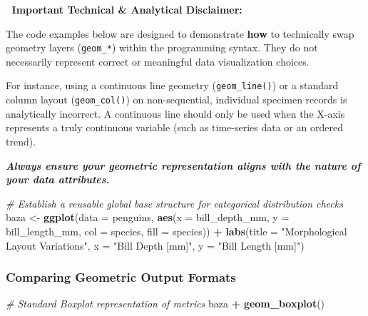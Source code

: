 \documentclass[
]{article}
\newenvironment{Shaded}{\begin{snugshade}}{\end{snugshade}}
\newcommand{\AttributeTok}[1]{\textcolor[rgb]{0.13,0.29,0.53}{#1}}
\newcommand{\CommentTok}[1]{\textcolor[rgb]{0.56,0.35,0.01}{\textit{#1}}}
\newcommand{\FunctionTok}[1]{\textcolor[rgb]{0.13,0.29,0.53}{\textbf{#1}}}
\newcommand{\NormalTok}[1]{#1}
\newcommand{\OtherTok}[1]{\textcolor[rgb]{0.56,0.35,0.01}{#1}}
\newcommand{\SpecialCharTok}[1]{\textcolor[rgb]{0.81,0.36,0.00}{\textbf{#1}}}
\newcommand{\StringTok}[1]{\textcolor[rgb]{0.31,0.60,0.02}{#1}}
\begin{document}
🚨 \textbf{Important Technical \& Analytical Disclaimer:} 🚨

The code examples below are designed to demonstrate \textbf{how} to
technically swap geometry layers (\texttt{geom\_*}) within the
programming syntax. They do not necessarily represent correct or
meaningful data visualization choices.

For instance, using a continuous line geometry (\texttt{geom\_line()})
or a standard column layout (\texttt{geom\_col()}) on non-sequential,
individual specimen records is analytically incorrect. A continuous line
should only be used when the X-axis represents a truly continuous
variable (such as time-series data or an ordered trend).

\textbf{\emph{Always ensure your geometric representation aligns with
the nature of your data attributes.}}

\begin{Shaded}
\begin{Highlighting}[]
\CommentTok{\# Establish a reusable global base structure for categorical distribution checks}
\NormalTok{baza }\OtherTok{\textless{}{-}} \FunctionTok{ggplot}\NormalTok{(}\AttributeTok{data =}\NormalTok{ penguins,}
               \FunctionTok{aes}\NormalTok{(}\AttributeTok{x =}\NormalTok{ bill\_depth\_mm,}
                   \AttributeTok{y =}\NormalTok{ bill\_length\_mm,}
                   \AttributeTok{col =}\NormalTok{ species,}
                   \AttributeTok{fill =}\NormalTok{ species)) }\SpecialCharTok{+}
  \FunctionTok{labs}\NormalTok{(}\AttributeTok{title =} \StringTok{"Morphological Layout Variations"}\NormalTok{,}
       \AttributeTok{x =} \StringTok{"Bill Depth [mm]"}\NormalTok{,}
       \AttributeTok{y =} \StringTok{"Bill Length [mm]"}\NormalTok{)}
\end{Highlighting}
\end{Shaded}

\subsubsection{Comparing Geometric Output
Formats}\label{comparing-geometric-output-formats}

\begin{Shaded}
\begin{Highlighting}[]
\CommentTok{\# Standard Boxplot representation of metrics}
\NormalTok{baza }\SpecialCharTok{+} \FunctionTok{geom\_boxplot}\NormalTok{()}
\end{Highlighting}
\end{Shaded}
\end{document}
